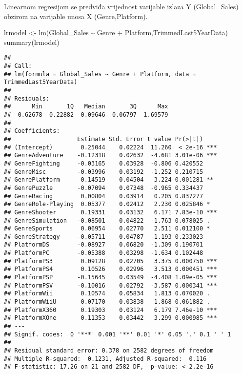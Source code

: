 \documentclass[
]{article}
\newenvironment{Shaded}{\begin{snugshade}}{\end{snugshade}}
\newcommand{\FunctionTok}[1]{\textcolor[rgb]{0.00,0.00,0.00}{#1}}
\newcommand{\NormalTok}[1]{#1}
\newcommand{\OtherTok}[1]{\textcolor[rgb]{0.56,0.35,0.01}{#1}}
\newcommand{\SpecialCharTok}[1]{\textcolor[rgb]{0.00,0.00,0.00}{#1}}
\begin{document}
Linearnom regresijom se predviđa vrijednost varijable izlaza Y
(Global\_Sales) obzirom na varijable unosa X (Genre,Platform).

\begin{Shaded}
\begin{Highlighting}[]
\NormalTok{lrmodel }\OtherTok{\textless{}{-}} \FunctionTok{lm}\NormalTok{(Global\_Sales }\SpecialCharTok{\textasciitilde{}}\NormalTok{ Genre }\SpecialCharTok{+}\NormalTok{ Platform,TrimmedLast5YearData)}
\FunctionTok{summary}\NormalTok{(lrmodel)}
\end{Highlighting}
\end{Shaded}

\begin{verbatim}
## 
## Call:
## lm(formula = Global_Sales ~ Genre + Platform, data = TrimmedLast5YearData)
## 
## Residuals:
##      Min       1Q   Median       3Q      Max 
## -0.62678 -0.22882 -0.09646  0.06797  1.69579 
## 
## Coefficients:
##                   Estimate Std. Error t value Pr(>|t|)    
## (Intercept)        0.25044    0.02224  11.260  < 2e-16 ***
## GenreAdventure    -0.12318    0.02632  -4.681 3.01e-06 ***
## GenreFighting     -0.03165    0.03928  -0.806 0.420552    
## GenreMisc         -0.03996    0.03192  -1.252 0.210715    
## GenrePlatform      0.14519    0.04504   3.224 0.001281 ** 
## GenrePuzzle       -0.07094    0.07348  -0.965 0.334437    
## GenreRacing        0.00804    0.03914   0.205 0.837277    
## GenreRole-Playing  0.05377    0.02412   2.230 0.025846 *  
## GenreShooter       0.19331    0.03132   6.171 7.83e-10 ***
## GenreSimulation   -0.08501    0.04822  -1.763 0.078025 .  
## GenreSports        0.06954    0.02770   2.511 0.012100 *  
## GenreStrategy     -0.05711    0.04787  -1.193 0.233023    
## PlatformDS        -0.08927    0.06820  -1.309 0.190701    
## PlatformPC        -0.05388    0.03298  -1.634 0.102448    
## PlatformPS3        0.09128    0.02705   3.375 0.000750 ***
## PlatformPS4        0.10526    0.02996   3.513 0.000451 ***
## PlatformPSP       -0.15645    0.03549  -4.408 1.09e-05 ***
## PlatformPSV       -0.10016    0.02792  -3.587 0.000341 ***
## PlatformWii        0.10574    0.05834   1.813 0.070020 .  
## PlatformWiiU       0.07170    0.03838   1.868 0.061882 .  
## PlatformX360       0.19303    0.03124   6.179 7.46e-10 ***
## PlatformXOne       0.11353    0.03442   3.299 0.000985 ***
## ---
## Signif. codes:  0 '***' 0.001 '**' 0.01 '*' 0.05 '.' 0.1 ' ' 1
## 
## Residual standard error: 0.378 on 2582 degrees of freedom
## Multiple R-squared:  0.1231, Adjusted R-squared:  0.116 
## F-statistic: 17.26 on 21 and 2582 DF,  p-value: < 2.2e-16
\end{verbatim}
\end{document}

